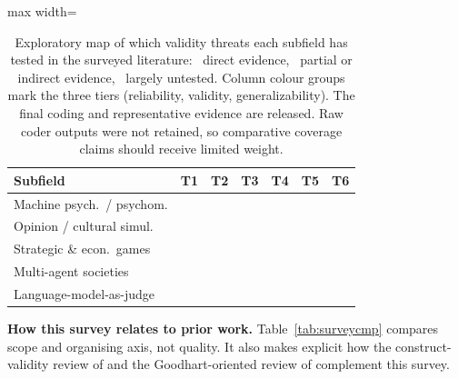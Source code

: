 \documentclass[11pt]{article}
\begin{document}
\newcommand{\covy}{\textcolor{tierC}{\ding{51}}}
\newcommand{\covp}{\textcolor{tierB}{\raisebox{0.18ex}{\scalebox{1.15}{$\circ$}}}}
\newcommand{\covn}{\textcolor{black!40}{\raisebox{0.18ex}{\scalebox{1.4}{$\cdot$}}}}
\begin{table}[H]
\centering
\small
\setlength{\tabcolsep}{3pt}
\renewcommand{\arraystretch}{1.12}
\begin{adjustbox}{max width=\columnwidth}
\begin{tabular}{@{}l|cc|cc|cc@{}}
\toprule
\rowcolor{cardblue!55}
\textbf{Subfield} & \textcolor{tierA}{\textbf{T1}} & \textcolor{tierA}{\textbf{T2}}
                  & \textcolor{tierB}{\textbf{T3}} & \textcolor{tierB}{\textbf{T4}}
                  & \textcolor{tierC}{\textbf{T5}} & \textcolor{tierC}{\textbf{T6}} \\
\midrule
Machine psych.\ / psychom. & \covy & \covy & \covy & \covp & \covp & \covy \\
\rowcolor{leafbg}
Opinion / cultural simul.  & \covy & \covy & \covy & \covp & \covy & \covp \\
Strategic \& econ.\ games  & \covy & \covp & \covp & \covy & \covp & \covp \\
\rowcolor{leafbg}
Multi-agent societies      & \covp & \covy & \covp & \covp & \covp & \covp \\
Language-model-as-judge    & \covy & \covy & \covy & \covp & \covp & \covp \\
\bottomrule
\end{tabular}
\end{adjustbox}
\caption{Exploratory map of which validity threats each subfield has tested in the surveyed
literature: \covy~direct evidence, \covp~partial or indirect evidence,
\covn~largely untested. Column colour groups mark the three tiers
(\textcolor{tierA}{reliability}, \textcolor{tierB}{validity},
\textcolor{tierC}{generalizability}). The final coding and representative
evidence are released. Raw coder outputs were not retained, so comparative
coverage claims should receive limited weight.}
\label{tab:coverage}
\end{table}

\textbf{How this survey relates to prior work.} Table~\ref{tab:surveycmp}
compares scope and organising axis, not quality. It also makes explicit how the
construct-validity review of \citet{bean2025measuring} and the Goodhart-oriented
review of \citet{uluirmak2026evalsafetygap} complement this survey.
\end{document}
